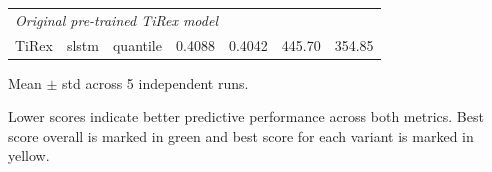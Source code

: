 \documentclass[a4paper,oneside,10pt,ngerman,english]{scrartcl}
\begin{document}
\begin{table}[htbp]
\begin{threeparttable}
\begin{tabular}{lllcccc}
			\midrule
			\multicolumn{7}{l}{{\small \emph{Original pre-trained TiRex model}}}\\
			TiRex & slstm & quantile  & 0.4088 & \cellcolor[HTML]{006837}\color[HTML]{f1f1f1}0.4042 & 445.70  & \cellcolor[HTML]{006837}\color[HTML]{f1f1f1} 354.85  \\
			\bottomrule
		\end{tabular}
		\begin{tablenotes}
			\small
			\item[a] Mean $\pm$ std across 5 independent runs.
			\item[b] Lower scores indicate better predictive performance across both metrics. Best score overall is marked in green and best score for each variant is marked in yellow.
		\end{tablenotes}	
	\end{threeparttable}
\end{table}
\end{document}
